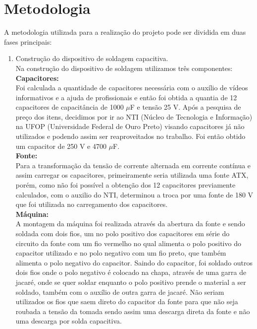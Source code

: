 \documentclass[a4paper,12pt]{article}%
\begin{document}
	\section{Metodologia}
	A metodologia utilizada para a realização do projeto pode ser dividida em duas fases principais:\\
	\begin{enumerate}
		\setcounter{enumi}{0}
	 \item Construção do dispositivo de soldagem capacitiva.\\
	 Na construção do dispositivo de soldagem utilizamos três componentes:\\
	\textbf{Capacitores:}\\
	 Foi calculada a quantidade de capacitores necessária com o auxílio de vídeos informativos e a ajuda de profissionais e então foi obtida a quantia de 12 capacitores de capacitância de 1000 $\mu$F e tensão 25 V. Após a pesquisa de preço dos itens, decidimos por ir ao NTI (Núcleo de Tecnologia e Informação) na UFOP (Universidade Federal de Ouro Preto) visando capacitores já não utilizados e podendo assim ser reaproveitados no trabalho. Foi então obtido um capacitor de 250 V e 4700 $\mu$F.\\
	 \textbf{Fonte:}\\
	 Para a transformação da tensão de corrente alternada em corrente contínua e assim carregar os capacitores, primeiramente seria utilizada uma fonte ATX, porém, como não foi possível a obtenção dos 12 capacitores previamente calculados, com o auxilio do NTI, determinou a troca por uma fonte de 180 V que foi utilizada no carregamento dos capacitores.\\
	 \textbf{Máquina:}\\
	 A montagem da máquina foi realizada através da abertura da fonte e sendo soldada com dois fios, um no polo positivo dos capacitores em série do circuito da fonte com um fio vermelho no qual alimenta o polo positivo do capacitor utilizado e no polo negativo com um fio preto, que também alimenta o polo negativo do capacitor. Saindo do capacitor, foi soldado outros dois fios onde o polo negativo é colocado na chapa, através de uma garra de jacaré, onde se quer soldar enquanto o polo positivo prende o material a ser soldado, também com o auxílio de outra garra de jacaré.
	 Não seriam utilizados os fios que saem direto do capacitor da fonte para que não seja roubada a tensão da tomada sendo assim uma descarga direta da fonte e não uma descarga por solda capacitiva.
	 
	 \pagebreak
	 

\end{enumerate}
\end{document}
